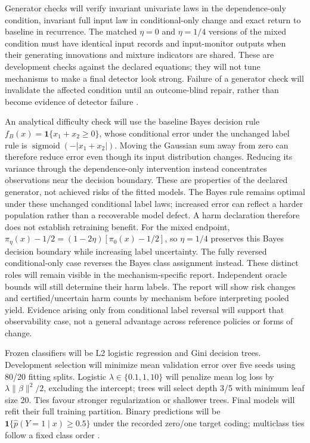 \documentclass[11pt,a4paper]{article}
\newcommand{\ind}{\mathbf{1}}
\begin{document}
Generator checks will verify invariant univariate laws in the dependence-only
condition, invariant full input law in conditional-only change and exact return
to baseline in recurrence. The matched $\eta=0$ and $\eta=1/4$ versions of
the mixed condition must have identical input records and input-monitor
outputs when their generating innovations and mixture indicators are shared.
These are development checks against the declared
equations; they will not tune mechanisms to make a final detector look strong.
Failure of a generator check will invalidate the affected condition until an
outcome-blind repair, rather than become evidence of detector failure
\cite{souza,cerqueira}.

An analytical difficulty check will use the baseline Bayes decision rule
$f_B(x)=\ind\{x_1+x_2\geq0\}$, whose conditional error under the unchanged
label rule is $\operatorname{sigmoid}(-|x_1+x_2|)$. Moving the Gaussian sum
away from zero can therefore reduce error even though its input distribution
changes. Reducing its variance through the dependence-only intervention
instead concentrates observations near the decision boundary. These are
properties of the declared generator, not achieved risks of the fitted models.
The Bayes rule remains optimal under these unchanged conditional label laws;
increased error can reflect a harder population rather than a recoverable
model defect. A harm declaration therefore does not establish retraining benefit.
For the mixed endpoint, $\pi_\eta(x)-1/2=(1-2\eta)[\pi_0(x)-1/2]$,
so $\eta=1/4$ preserves this Bayes decision boundary while increasing label
uncertainty. The fully reversed conditional-only case reverses the Bayes
class assignment instead. These distinct roles will remain visible in the
mechanism-specific report.
Independent oracle bounds will still determine their harm labels. The report
will show risk changes and certified/uncertain harm counts by mechanism before
interpreting pooled yield. Evidence arising only from conditional label
reversal will support that observability case, not a general advantage across
reference policies or forms of change.

Frozen classifiers will be L2 logistic regression and Gini decision trees.
Development selection will minimize mean validation error over five seeds using
80/20 fitting splits. Logistic $\lambda\in\{0.1,1,10\}$ will penalize mean
log loss by $\lambda\|\beta\|^2/2$, excluding the intercept; trees will select
depth 3/5 with minimum leaf size 20. Ties favour stronger regularization or
shallower trees. Final models will refit their full training partition.
Binary predictions will be $\ind\{\widehat p(Y=1\mid x)\geq0.5\}$ under
the recorded zero/one target coding; multiclass ties follow a fixed class order
\cite{souza}.
\end{document}
